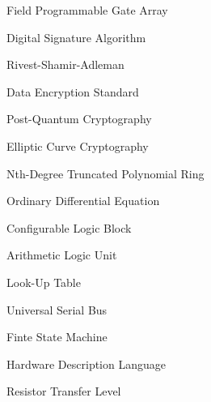 \begin{nomenclature}
\begin{description}
\item{} Field Programmable Gate Array

\item{} Digital Signature Algorithm

\item{} Rivest-Shamir-Adleman

\item{} Data Encryption Standard

\item{} Post-Quantum Cryptography

\item{} Elliptic Curve Cryptography

\item{} Nth-Degree Truncated Polynomial Ring

\item{} Ordinary Differential Equation

\item{} Configurable Logic Block

\item{} Arithmetic Logic Unit

\item{} Look-Up Table

\item{} Universal Serial Bus

\item{} Finte State Machine

\item{} Hardware Description Language

\item{} Resistor Transfer Level
\end{description}
\end{nomenclature}

\cleardoublepage{} %
